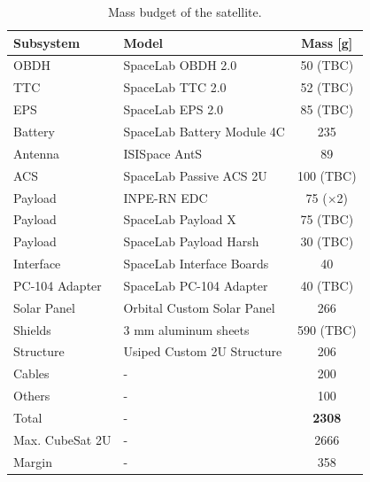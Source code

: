 \begin{table}[!h]
    \centering
    \begin{tabular}{llc}
        \toprule[1.5pt]
        \textbf{Subsystem} & \textbf{Model} & \textbf{Mass [g]} \\
        \midrule
        OBDH            & SpaceLab OBDH 2.0             & 50 (TBC) \\
        TTC             & SpaceLab TTC 2.0              & 52 (TBC) \\
        EPS             & SpaceLab EPS 2.0              & 85 (TBC) \\
        Battery         & SpaceLab Battery Module 4C    & 235 \\
        Antenna         & ISISpace AntS                 & 89 \\
        ACS             & SpaceLab Passive ACS 2U       & 100 (TBC) \\
        Payload         & INPE-RN EDC                   & 75 ($\times$2) \\
        Payload         & SpaceLab Payload X            & 75 (TBC) \\
        Payload         & SpaceLab Payload Harsh        & 30 (TBC) \\
        Interface       & SpaceLab Interface Boards     & 40 \\
        PC-104 Adapter  & SpaceLab PC-104 Adapter       & 40 (TBC) \\
        Solar Panel     & Orbital Custom Solar Panel    & 266 \\
        Shields         & 3 mm aluminum sheets          & 590 (TBC) \\
        Structure       & Usiped Custom 2U Structure    & 206 \\
        Cables          & -                             & 200 \\
        Others          & -                             & 100 \\
        \midrule
        Total           & -                             & \textbf{2308} \\
        Max. CubeSat 2U & -                             & 2666 \\
        Margin          & -                             & 358 \\
        \bottomrule[1.5pt]
    \end{tabular}
    \caption{Mass budget of the satellite.}
    \label{tab:mass-budget}
\end{table}

